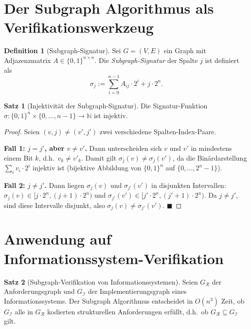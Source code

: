 ﻿\documentclass[a4paper,12pt]{report}
\theoremstyle{definition}
\newtheorem{definition}{Definition}[section]
\newtheorem{satz}{Satz}[section]
\begin{document}
\section{Der Subgraph Algorithmus als Verifikationswerkzeug}

\begin{definition}[Subgraph-Signatur]
\label{def:sigsub}
Sei $G = (V, E)$ ein Graph mit Adjazenzmatrix $A \in \{0,1\}^{n \times n}$.
Die \emph{Subgraph-Signatur} der Spalte $j$ ist definiert als
\[
  \sigma_j := \sum_{i=0}^{n-1} A_{ij} \cdot 2^i + j \cdot 2^n.
\]
\end{definition}

\begin{satz}[Injektivität der Subgraph-Signatur]
\label{satz:injektiv}
Die Signatur-Funktion $\sigma: \{0,1\}^n \times \{0,\ldots,n-1\} \to \mathbb{N}$
ist injektiv.
\end{satz}

\begin{proof}
Seien $(v, j) \neq (v', j')$ zwei verschiedene Spalten-Index-Paare.

\textbf{Fall 1: $j = j'$, aber $v \neq v'$.}
Dann unterscheiden sich $v$ und $v'$ in mindestens einem Bit $k$, d.h.\ $v_k \neq v'_k$.
Damit gilt $\sigma_j(v) \neq \sigma_j(v')$, da die Binärdarstellung $\sum_i v_i \cdot 2^i$
injektiv ist (bijektive Abbildung von $\{0,1\}^n$ auf $\{0,\ldots,2^n-1\}$).

\textbf{Fall 2: $j \neq j'$.}
Dann liegen $\sigma_j(v)$ und $\sigma_{j'}(v')$ in disjunkten Intervallen:
$\sigma_j(v) \in [j \cdot 2^n, (j+1) \cdot 2^n)$ und
$\sigma_{j'}(v') \in [j' \cdot 2^n, (j'+1) \cdot 2^n)$.
Da $j \neq j'$, sind diese Intervalle disjunkt, also $\sigma_j(v) \neq \sigma_{j'}(v')$. $\blacksquare$
\end{proof}

\section{Anwendung auf Informationssystem-Verifikation}

\begin{satz}[Subgraph-Verifikation von Informationssystemen]
\label{satz:subgraphverif}
Seien $G_\mathcal{R}$ der Anforderungsgraph und $G_\mathcal{I}$ der Implementierungsgraph
eines Informationssystems. Der Subgraph Algorithmus entscheidet in $O(n^3)$ Zeit, ob
$G_\mathcal{I}$ alle in $G_\mathcal{R}$ kodierten strukturellen Anforderungen erfüllt,
d.h.\ ob $G_\mathcal{R} \subseteq G_\mathcal{I}$ gilt.
\end{satz}
\end{document}
